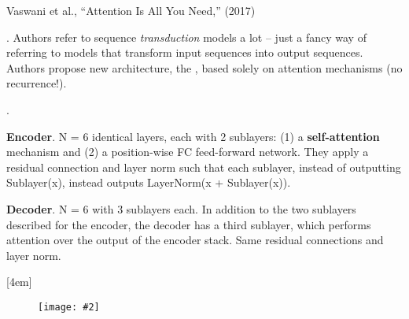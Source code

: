 \documentclass[11pt]{article}
\newcommand\myfig[2][0.3\textwidth]{\begin{figure}[h!]\centering\texttt{[image: \#2]}\end{figure}}
\newcommand\myspace[1][]{\vspace{#1\bigskipamount}}
\newcommand\p{\Needspace{10\baselineskip} \noindent}
\begin{document}
\vspace{-1em}
{\footnotesize Vaswani et al., ``Attention Is All You Need,'' (2017)}

\p {}. Authors refer to sequence \textit{transduction} models a lot -- just a fancy way of referring to models that transform input sequences into output sequences. Authors propose new architecture, the , based solely on attention mechanisms (no recurrence!). 

\myspace
\p {}. 
\begin{compactitem}
	\item \textbf{Encoder}. N = 6 identical layers, each with 2 sublayers: (1) a  \textbf{self-attention} mechanism and (2) a position-wise FC feed-forward network. They apply a residual connection and layer norm such that each sublayer, instead of outputting Sublayer(x), instead outputs LayerNorm(x + Sublayer(x)).
	
	\item \textbf{Decoder}. N = 6 with 3 sublayers each. In addition to the two sublayers described for the encoder, the decoder has a third sublayer, which performs  attention over the output of the encoder stack. Same residual connections and layer norm. 
\end{compactitem}[4em]
\myfig[0.4\textwidth]{figs/transformer.png}
\end{document}
